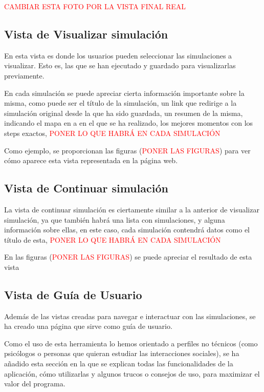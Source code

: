 \textcolor{red}{CAMBIAR ESTA FOTO POR LA VISTA FINAL REAL}

\subsection{Vista de Visualizar simulación}

En esta vista es donde los usuarios pueden seleccionar las simulaciones a visualizar. Esto es, las que se han ejecutado y guardado para visualizarlas previamente.

En cada simulación se puede apreciar cierta información importante sobre la misma, como puede ser el título de la simulación, un link que redirige a la simulación original desde la que ha sido guardada, un resumen de la misma, indicando el mapa en a en el que se ha realizado, los mejores momentos con los steps exactos, \textcolor{red}{PONER LO QUE HABRÁ EN CADA SIMULACIÓN}

Como ejemplo, se proporcionan las figuras (\textcolor{red}{PONER LAS FIGURAS}) para ver cómo aparece esta vista representada en la página web.


\subsection{Vista de Continuar simulación}

La vista de continuar simulación es ciertamente similar a la anterior de visualizar simulación, ya que también habrá una lista con simulaciones, y alguna información sobre ellas, en este caso, cada simulación contendrá datos como el título de esta, \textcolor{red}{PONER LO QUE HABRÁ EN CADA SIMULACIÓN}

 En las figuras (\textcolor{red}{PONER LAS FIGURAS}) se puede apreciar el resultado de esta vista

\subsection{Vista de Guía de Usuario}

Además de las vistas creadas para navegar e interactuar con las simulaciones, se ha creado una página que sirve como guía de usuario. 

Como el uso de esta herramienta lo hemos orientado a perfiles no técnicos (como psicólogos o personas que quieran estudiar las interacciones sociales), se ha añadido esta sección en la que se explican todas las funcionalidades de la aplicación, cómo utilizarlas y algunos trucos o consejos de uso, para maximizar el valor del programa.

